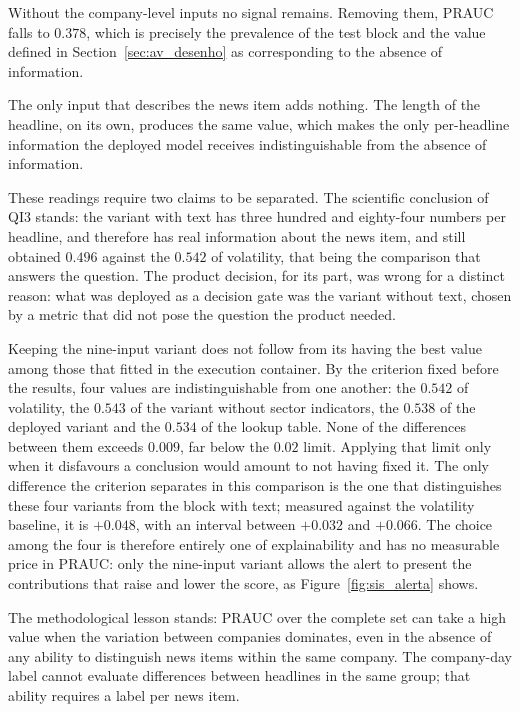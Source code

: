 Without the company-level inputs no signal remains. Removing them, \gls{PRAUC} falls to $0.378$,
which is precisely the prevalence of the test block and the value defined in
Section~\ref{sec:av_desenho} as corresponding to the absence of information.

The only input that describes the news item adds nothing. The length of the headline, on its own,
produces the same value, which makes the only per-headline information the deployed model
receives indistinguishable from the absence of information.

These readings require two claims to be separated. The scientific conclusion of \gls{QI}3 stands:
the variant with text has three hundred and eighty-four numbers per headline, and therefore has
real information about the news item, and still obtained $0.496$ against the $0.542$ of volatility,
that being the comparison that answers the question. The product decision, for its part, was wrong
for a distinct reason: what was deployed as a decision gate was the variant without text, chosen by
a metric that did not pose the question the product needed.

Keeping the nine-input variant does not follow from its having the best value among those that
fitted in the execution container. By the criterion fixed before the results, four values are
indistinguishable from one another: the $0.542$ of volatility, the $0.543$ of the variant without
sector indicators, the $0.538$ of the deployed variant and the $0.534$ of the lookup table.
None of the differences between them exceeds $0.009$, far below the $0.02$ limit. Applying that limit only
when it disfavours a conclusion would amount to not having fixed it. The only difference the
criterion separates in this comparison is the one that distinguishes these four variants from the
block with text; measured against the volatility baseline, it is $+0.048$, with an interval between
$+0.032$ and $+0.066$. The choice among the
four is therefore entirely one of explainability and has no measurable price in \gls{PRAUC}: only
the nine-input variant allows the alert to present the contributions that raise and lower the
score, as Figure~\ref{fig:sis_alerta} shows.

The methodological lesson stands: \gls{PRAUC} over the complete set can take a high value when the
variation between companies dominates, even in the absence of any ability to distinguish news items
within the same company. The company-day label cannot evaluate differences between headlines
in the same group; that ability requires a label per news item.

